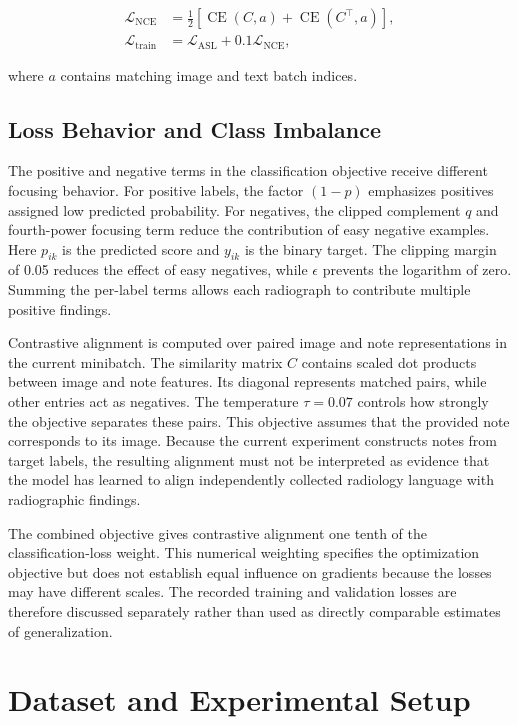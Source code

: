 \documentclass[conference,letterpaper]{IEEEtran}
\begin{document}
\begin{align}
\mathcal{L}_{\mathrm{NCE}}
&=\tfrac{1}{2}
[\operatorname{CE}(C,a)+
\operatorname{CE}(C^\top,a)],\\
\mathcal{L}_{\mathrm{train}}
&=\mathcal{L}_{\mathrm{ASL}}
+0.1\mathcal{L}_{\mathrm{NCE}},
\end{align}

where $a$ contains matching image and text batch indices.

\subsection{Loss Behavior and Class Imbalance}

The positive and negative terms in the classification objective receive different focusing behavior. For positive labels, the factor $(1-p)$ emphasizes positives assigned low predicted probability. For negatives, the clipped complement $q$ and fourth-power focusing term reduce the contribution of easy negative examples. Here $p_{ik}$ is the predicted score and $y_{ik}$ is the binary target. The clipping margin of 0.05 reduces the effect of easy negatives, while $\epsilon$ prevents the logarithm of zero. Summing the per-label terms allows each radiograph to contribute multiple positive findings.

Contrastive alignment is computed over paired image and note representations in the current minibatch. The similarity matrix $C$ contains scaled dot products between image and note features. Its diagonal represents matched pairs, while other entries act as negatives. The temperature $\tau=0.07$ controls how strongly the objective separates these pairs. This objective assumes that the provided note corresponds to its image. Because the current experiment constructs notes from target labels, the resulting alignment must not be interpreted as evidence that the model has learned to align independently collected radiology language with radiographic findings.

The combined objective gives contrastive alignment one tenth of the classification-loss weight. This numerical weighting specifies the optimization objective but does not establish equal influence on gradients because the losses may have different scales. The recorded training and validation losses are therefore discussed separately rather than used as directly comparable estimates of generalization.

\section{Dataset and Experimental Setup}
\end{document}
